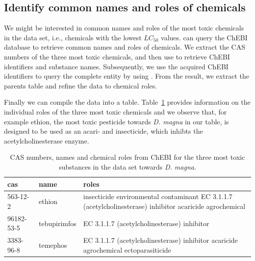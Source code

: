 \documentclass[article]{jss}
\begin{document}
\subsection[Identify common names and roles of chemicals]{Identify common names and roles of chemicals}
We might be interested in common names and roles of the most toxic chemicals in the  data set, i.e., chemicals with the lowest $LC_{50}$ values.  can query the ChEBI database \citep{chebi} to retrieve common names and roles of chemicals. We extract the CAS numbers of the three most toxic chemicals, and then use  to retrieve ChEBI identifiers and substance names. Subsequently, we use the acquired ChEBI identifiers to query the complete entity by using . From the result, we extract the parents table and refine the data to chemical roles.

\begin{CodeChunk}
\end{CodeChunk}

Finally we can compile the data into a table. Table~\ref{tab:chebi} provides information on the individual roles of the three most toxic chemicals and we observe that, for example ethion, the most toxic pesticide towards \textit{D. magna} in our table, is designed to be used as an acari- and insecticide, which inhibts the acetylcholinesterase enzyme.

\begin{table}[t!]
\centering
\begin{tabular}{p{2cm}p{2cm}p{8cm}}
  \hline
  cas & name & roles \\
  \hline
  563-12-2 & ethion & insecticide \newline environmental contaminant \newline EC 3.1.1.7 (acetylcholinesterase) inhibitor \newline acaricide \newline agrochemical \\
  96182-53-5 & tebupirimfos & EC 3.1.1.7 (acetylcholinesterase) inhibitor \\
  3383-96-8 & temephos & EC 3.1.1.7 (acetylcholinesterase) inhibitor \newline acaricide \newline agrochemical \newline ectoparasiticide \\
\hline
\end{tabular}
\caption{CAS numbers, names and chemical roles from ChEBI for the three most toxic substances in the  data set towards \textit{D. magna}.}
\label{tab:chebi}
\end{table}
\end{document}
